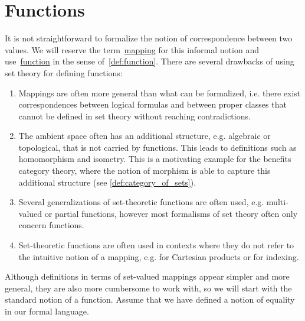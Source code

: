 \section{Functions}\label{sec:functions}

It is not straightforward to formalize the notion of correspondence between two values. We will reserve the term~\ul{mapping} for this informal notion and use~\ul{function} in the sense of~\cref{def:function}. There are several drawbacks of using set theory for defining functions:
\begin{enumerate}
  \item Mappings are often more general than what can be formalized, i.e. there exist correspondences between logical formulas and between proper classes that cannot be defined in set theory without reaching contradictions.
  \item The ambient space often has an additional structure, e.g. algebraic or topological, that is not carried by functions. This leads to definitions such as homomorphism and isometry. This is a motivating example for the benefits category theory, where the notion of morphism is able to capture this additional structure (see \cref{def:category_of_sets}).
  \item Several generalizations of set-theoretic functions are often used, e.g. multi-valued or partial functions, however most formalisms of set theory often only concern functions.
  \item Set-theoretic functions are often used in contexts where they do not refer to the intuitive notion of a mapping, e.g. for Cartesian products or for indexing.
\end{enumerate}

Although definitions in terms of set-valued mappings appear simpler and more general, they are also more cumbersome to work with, so we will start with the standard notion of a function. Assume that we have defined a notion of equality in our formal language.

